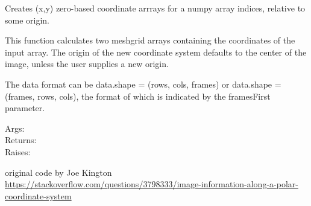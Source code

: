 \documentclass[a4paper,10pt,english]{sphinxmanual}
\begin{document}
\begin{fulllineitems}
\label{ryutils:pyradi.ryutils.index_coords}
Creates (x,y) zero-based coordinate arrrays for a numpy array indices, relative to some origin.

This function calculates two meshgrid arrays containing the coordinates of the 
input array.  The origin of the new coordinate system  defaults to the 
center of the image, unless the user supplies a new origin.

The data format can be data.shape = (rows, cols, frames) or 
data.shape = (frames, rows, cols), the format of which is indicated by the 
framesFirst parameter.
\begin{description}
\item[{Args:}] \leavevmode
{}

\item[{Returns:}] \leavevmode
{}

\item[{Raises:}] \leavevmode
{}

\end{description}

original code by Joe Kington
\href{https://stackoverflow.com/questions/3798333/image-information-along-a-polar-coordinate-system}{https://stackoverflow.com/questions/3798333/image-information-along-a-polar-coordinate-system}

\end{fulllineitems}
\end{document}
